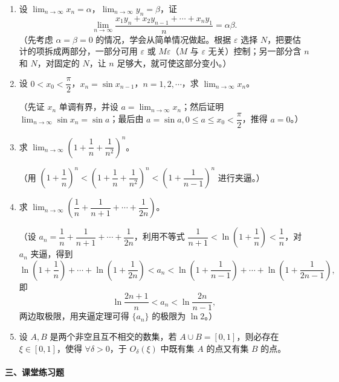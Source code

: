 \begin{enumerate}[label=\arabic*.]
  \item 设 $\displaystyle\lim_{n\to\infty}x_n=\alpha$，$\displaystyle\lim_{n\to\infty}y_n=\beta$，证
  \[
    \lim_{n\to\infty}\frac{x_1y_n+x_2y_{n-1}+\cdots+x_ny_1}{n}=\alpha\beta.
  \]
  （先考虑 $\alpha=\beta=0$ 的情况，学会从简单情况做起。根据 $\varepsilon$ 选择 $N$，把要估计的项拆成两部分，一部分可用 $\varepsilon$ 或 $M\varepsilon$（$M$ 与 $\varepsilon$ 无关）控制；另一部分含 $n$ 和 $N$，对固定的 $N$，让 $n$ 足够大，就可使这部分变小。）
  \item 设 $0<x_0<\dfrac\pi2$，$x_n=\sin x_{n-1}$，$n=1,2,\cdots$，求 $\displaystyle\lim_{n\to\infty}x_n$。

  （先证 $x_n$ 单调有界，并设 $a=\displaystyle\lim_{n\to\infty}x_n$；然后证明 $\displaystyle\lim_{n\to\infty}\sin x_n=\sin a$；最后由 $a=\sin a,0\le a\le x_0<\dfrac\pi2$，推得 $a=0$。）
  \item 求 $\displaystyle\lim_{n\to\infty}\left(1+\dfrac1n+\dfrac1{n^2}\right)^n$。

  （用 $\left(1+\dfrac1n\right)^n<\left(1+\dfrac1n+\dfrac1{n^2}\right)^n<\left(1+\dfrac1{n-1}\right)^n$ 进行夹逼。）
  \item 求 $\displaystyle\lim_{n\to\infty}\left(\dfrac1n+\dfrac1{n+1}+\cdots+\dfrac1{2n}\right)$。

  （设 $a_n=\dfrac1n+\dfrac1{n+1}+\cdots+\dfrac1{2n}$，利用不等式 $\dfrac1{n+1}<\ln\left(1+\dfrac1n\right)<\dfrac1n$，对 $a_n$ 夹逼，得到
  \[
    \ln\left(1+\frac1n\right)+\cdots+\ln\left(1+\frac1{2n}\right)
    <a_n
    <\ln\left(1+\frac1{n-1}\right)+\cdots+\ln\left(1+\frac1{2n-1}\right),
  \]
  即
  \[
    \ln\frac{2n+1}{n}<a_n<\ln\frac{2n}{n-1},
  \]
  两边取极限，用夹逼定理可得 $\{a_n\}$ 的极限为 $\ln2$。）
  \item 设 $A,B$ 是两个非空且互不相交的数集，若 $A\cup B=[0,1]$，则必存在 $\xi\in[0,1]$，使得 $\forall\delta>0$，于 $O_\delta(\xi)$ 中既有集 $A$ 的点又有集 $B$ 的点。
\end{enumerate}

\paragraph{三、课堂练习题}

